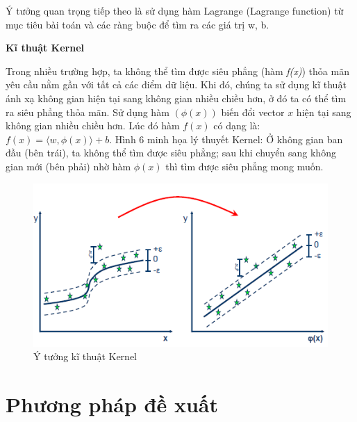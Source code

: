 \documentclass[12pt]{extarticle}
\begin{document}
			\par Ý tưởng quan trọng tiếp theo là sử dụng hàm Lagrange (Lagrange function) từ mục tiêu bài toán và các ràng buộc để tìm ra các giá trị w, b.

			\par \textbf{Kĩ thuật Kernel}
			\par Trong nhiều trường hợp, ta không thể tìm được siêu phẳng (hàm \textit{f(x)}) thỏa mãn yêu cầu nằm gần với tất cả các điểm dữ liệu. Khi đó, chúng ta sử dụng kĩ thuật ánh xạ không gian hiện tại sang không gian nhiều chiều hơn, ở đó ta có thể tìm ra siêu phẳng thỏa mãn. Sử dụng hàm $(\phi(x))$ biến đổi vector $x$ hiện tại sang không gian nhiều chiều hơn. Lúc đó hàm $f(x)$ có dạng là: $f(x)=\langle w,\phi(x)\rangle + b$. Hình 6 minh họa lý thuyết Kernel: Ở không gian ban đầu (bên trái), ta không thể tìm được siêu phẳng; sau khi chuyển sang không gian mới (bên phải) nhờ hàm $\phi(x)$ thì tìm được siêu phẳng mong muốn. \\[100pt]
	\begin{figure}[h!]
				\includegraphics[width=\linewidth]{kernel}
				\caption[Ý tưởng kĩ thuật Kernel]{Ý tưởng kĩ thuật Kernel  \footnotemark[1]}
				\label{fig:svr}
			\end{figure}
	\section{Phương pháp đề xuất}	
							
\end{document}
